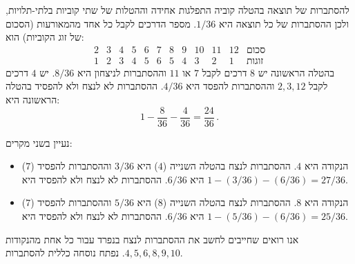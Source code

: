 

להסתברות של תוצאה בהטלה קוביה התפלגות אחידה וההטלות של שתי קוביות בלתי-תלויות, ולכן ההסתברות של כל תוצאה היא 
$1/36$.
מספר הדרכים לקבל כל אחד מהמאורעות (הסכום של זוג הקוביות) הוא:
\[
\begin{array}{rrrrrrrrrrr|l}
2 & 3 & 4 & 5 & 6 & 7 & 8 & 9 & 10 & 11 & 12&\textrm{סכום}\\\hline
 1 & 2 & 3 & 4 & 5 & 6 & 5 & 4 & 3 & 2 & 1&\textrm{זוגות}
\end{array}
\]
בהטלה הראשונה יש 
$8$
דרכים לקבל
$7$
או
$11$
וההסתברות לניצחון היא
$8/36$.
יש
$4$
דרכים לקבל
$2,3,12$
וההסתברות להפסד היא 
$4/36$.
ההסתברות לא לנצח ולא להפסיד בהטלה הראשונה היא:
\[
1 - \frac{8}{36} - \frac{4}{36} = \frac{24}{36}\,.
\]


נעיין בשני מקרים:
\begin{itemize}
\item 
הנקודה היא
$4$.
ההסתברות לנצח בהטלה השנייה ($4$) היא
$3/36$
וההסתברות להפסיד ($7$) היא
$6/36$.
ההסתברות לא לנצח ולא להפסיד היא
$1-(3/36)-(6/36)=27/36$.

\item
הנקודה היא $8$. ההסתברות לנצח בהטלה השנייה ($8$) היא
$5/36$
וההסתברות להפסיד ($7$) היא
$6/36$.
ההסתברות לא לנצח ולא להפסיד היא
$1-(5/36)-(6/36)=25/36$.
\end{itemize}
אנו רואים שחייבים לחשב את ההסתברות לנצח בנפרד עבור כל אחת מהנקודות 
$4,5,6,8,9,10$.
נפתח נוסחה כללית להסתברות.

